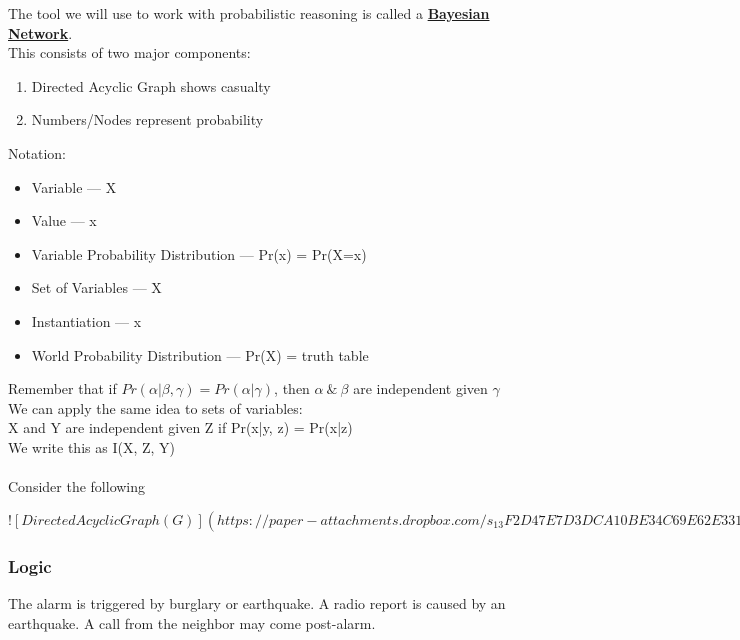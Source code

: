 \documentclass[../../lecture_notes.tex]{subfiles}
\begin{document}
\noindent The tool we will use to work with probabilistic reasoning is called a \textbf{\underline{Bayesian Network}}.\\
This consists of two major components:
\begin{enumerate} [itemsep=0mm]
	\item Directed Acyclic Graph shows casualty
	\item Numbers/Nodes represent probability
\end{enumerate}
\noindent Notation:
\begin{itemize} [itemsep=0mm]
	\item Variable — X
	\item Value — x
	\item Variable Probability Distribution — Pr(x) = Pr(X=x)
	\item Set of Variables — X
	\item Instantiation — x
	\item World Probability Distribution — Pr(X) = truth table
\end{itemize} \medskip

\noindent Remember that if $Pr(\alpha|\beta, \gamma) = Pr(\alpha|\gamma)$, 
	then $\alpha\ \&\ \beta$ are independent given $\gamma$\\
We can apply the same idea to sets of variables:\\
	\indent X and Y are independent given Z if Pr(x|y, z) = Pr(x|z)\\
	\indent We write this as I(X, Z, Y)\\
\\
Consider the following

\newpage
$![Directed Acyclic Graph (G)](https://paper-attachments.dropbox.com/s_13F2D47E7D3DCA10BE34C69E62E331D2224F9C5F91BEA8639D242F2792B86517_1590115697975_Untitled+drawing.jpg)$
\newpage

\subsubsection*{Logic}
\noindent The alarm is triggered by burglary or earthquake.
A radio report is caused by an earthquake.
A call from the neighbor may come post-alarm.
\end{document}
